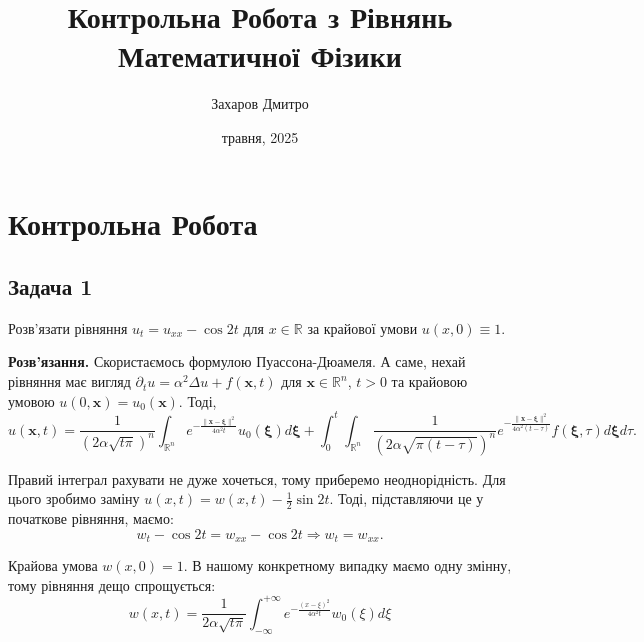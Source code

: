 \documentclass{test_template}
\title{\huge\sffamily\bfseries Контрольна Робота з Рівнянь Математичної Фізики}
\author{\Large\sffamily Захаров Дмитро}
\date{\sffamily 26 травня, 2025}
\begin{document}
\pagestyle{fancy}

\maketitle

\tableofcontents

\pagebreak

\section{Контрольна Робота}

\subsection{Задача 1}

\begin{problem}
    Розв'язати рівняння $u_t = u_{xx} - \cos 2t$ для $x \in \mathbb{R}$ за
    крайової умови $u(x,0)\equiv 1$.
\end{problem}

\textbf{Розв'язання.} Скористаємось формулою Пуассона-Дюамеля. А саме, нехай
рівняння має вигляд $\partial_t u = \alpha^2 \Delta u + f(\mathbf{x},t)$ для 
$\mathbf{x} \in \mathbb{R}^n$, $t>0$ та крайовою умовою $u(0,\mathbf{x})=u_0(\mathbf{x})$. Тоді,
\begin{equation*}
    u(\mathbf{x},t) = \frac{1}{(2\alpha\sqrt{t\pi})^n}\int_{\mathbb{R}^n}e^{-\frac{\|\mathbf{x}-\boldsymbol{\xi}\|^2}{4\alpha^2 t}}u_0(\boldsymbol{\xi})d\boldsymbol{\xi} + \int_0^t \int_{\mathbb{R}^n}\frac{1}{(2\alpha\sqrt{\pi(t-\tau)})^n}e^{-\frac{\|\mathbf{x}-\boldsymbol{\xi}\|^2}{4\alpha^2(t-\tau)}}f(\boldsymbol{\xi},\tau)d\boldsymbol{\xi}d\tau.
\end{equation*}

Правий інтеграл рахувати не дуже хочеться, тому приберемо неоднорідність. Для
цього зробимо заміну $u(x,t) = w(x,t) - \frac{1}{2}\sin 2t$. Тоді, 
підставляючи це у початкове рівняння, маємо:
\begin{equation*}
    w_t - \cos 2t = w_{xx} - \cos 2t \Rightarrow \boxed{w_t = w_{xx}}.
\end{equation*}

Крайова умова $w(x,0)=1$. В нашому конкретному випадку маємо одну змінну, тому
рівняння дещо спрощується:
\begin{equation*}
    w(x,t) = \frac{1}{2\alpha \sqrt{t\pi}}\int_{-\infty}^{+\infty} e^{-\frac{(x-\xi)^2}{4\alpha^2 t}}w_0(\xi)d\xi 
\end{equation*}
\end{document}
